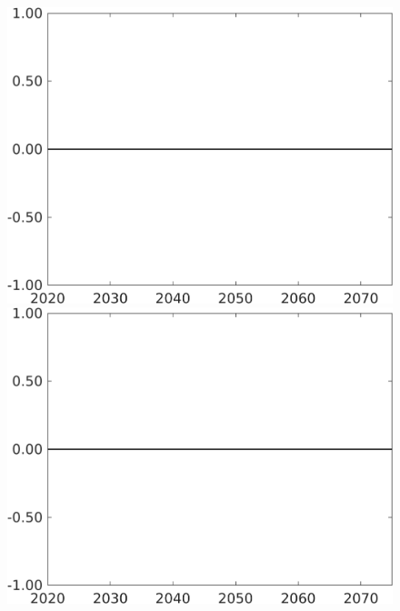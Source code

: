 \documentclass[12pt]{article}
\begin{document}
\begin{figure}[h!!]
\begin{minipage}[]{0.32\textwidth}
	\end{minipage}		
	\begin{minipage}[]{0.32\textwidth}
		\includegraphics[width=1\textwidth]{../../codding_model/own_basedOnFried/optimalPol_010922_revision/figures/all_13Sept22/CompTaufPER_bytaul_Reg0_sff_spillover0_nsk0_xgr1_knspil0_sep1_LFlimit1_emsbase0_countec0_GovRev0_etaa0.79_lgd0.png}
	\end{minipage}		
	\begin{minipage}[]{0.32\textwidth}
		\includegraphics[width=1\textwidth]{../../codding_model/own_basedOnFried/optimalPol_010922_revision/figures/all_13Sept22/CompTaufPER_bytaul_Reg0_sg_spillover0_nsk0_xgr1_knspil0_sep1_LFlimit1_emsbase0_countec0_GovRev0_etaa0.79_lgd0.png}

\end{minipage}
\end{figure}
\end{document}
